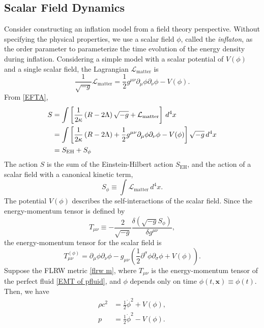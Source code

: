 \documentclass[12pt]{article}
\numberwithin{equation}{section}
\begin{document}
\subsection{Scalar Field Dynamics}
Consider constructing an inflation model from a field theory perspective. Without specifying the physical properties, we use a scalar field $\phi$, called the \textit{inflaton}, as the order parameter to parameterize the time evolution of the energy density during inflation. Considering a simple model with a scalar potential of $V(\phi)$ and a single scalar field, the Lagrangian $\mathcal{L}_{\textrm{matter}}$ is 
\begin{equation}
    \frac{1}{\sqrt{-g}}\mathcal{L}_{\textrm{matter}} = \frac{1}{2}g^{\mu\nu}\partial_{\mu}\phi \partial_{\nu}\phi - V(\phi).
\end{equation}
From \eqref{EFTA},
\begin{align}
    S &= \int \left[ \frac{1}{2\kappa}\left( R - 2\Lambda \right)\sqrt{-g} + \mathcal{L}_{\textrm{matter}} \right]\, d^4x \notag\\
    &= \int \left[ \frac{1}{2\kappa}\left( R - 2\Lambda \right) + \frac{1}{2}g^{\mu\nu}\partial_{\mu}\phi \partial_{\nu}\phi - V(\phi) \right]\sqrt{-g}\, d^4x\notag\\
    &= S_{\textrm{EH}} + S_{\phi}
\end{align}
The action $S$ is the sum of the Einstein-Hilbert action $S_{\textrm{EH}}$, and the action of a scalar field with a canonical kinetic term,
\begin{equation}
    S_{\phi} \equiv \int \mathcal{L}_{\textrm{matter}}\,d^4 x.
\end{equation}
The potential $V(\phi)$ describes the self-interactions of the scalar field. Since the energy-momentum tensor is defined by
\begin{equation}
    T_{\mu\nu} \equiv -\frac{2}{\sqrt{-g}}\frac{\delta (\sqrt{-g}S_\phi)}{\delta g^{\mu\nu}},
\end{equation}
the energy-momentum tensor for the scalar field is
\begin{equation}
    T_{\mu\nu}^{(\phi)} = \partial_\mu \phi \partial_\nu \phi - g_{\mu\nu}\left(  \frac{1}{2}\partial^\sigma \phi \partial_\sigma \phi + V(\phi) \right).
\end{equation}
Suppose the FLRW metric \eqref{flrw m}, where $T_{\mu\nu}$ is the energy-momentum tensor of the perfect fluid \eqref{EMT of pfluid}, and $\phi$ depends only on time $\phi(t, \bm{x}) \equiv \phi(t)$. Then, we have 
\begin{align}
    \rho c^2 &= \frac{1}{2}\dot{\phi}^2 + V(\phi),\\
    p &= \frac{1}{2}\dot{\phi}^2 - V(\phi).
\end{align}
\end{document}
